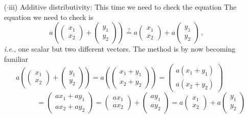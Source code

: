 {\begin{enumerate}
\[b\begin{pmatrix} x_1\\x_2\end{pmatrix}\, ,
\]
as required.
\item[($\cdot$iii)] Additive distributivity:
This time we need to check the equation
The equation we need to check is
\[
a\left(
\begin{pmatrix}x_1\\x_2\end{pmatrix}
+
\begin{pmatrix}y_1\\y_2\end{pmatrix}\right)\stackrel?=
a\begin{pmatrix}x_1\\x_2\end{pmatrix}+
a\begin{pmatrix}y_1\\y_2\end{pmatrix}
\, ,
\] 
{\it i.e.}, one scalar but two different vectors.
The method is by now becoming familiar
\[
a\left(
\begin{pmatrix}x_1\\x_2\end{pmatrix}
+
\begin{pmatrix}y_1\\y_2\end{pmatrix}\right)=
a\left(
\begin{pmatrix}x_1+y_1\\x_2+y_2\end{pmatrix}
\right)
=
\begin{pmatrix}a(x_1+y_1)\\a(x_2+y_2)\end{pmatrix}
\qquad\] \[\qquad\qquad=
\begin{pmatrix}ax_1+ay_1\\ax_2+ay_2\end{pmatrix}
=
\begin{pmatrix}ax_1\\ax_2\end{pmatrix}+
\begin{pmatrix}ay_1\\ay_2\end{pmatrix}
=
a\begin{pmatrix}x_1\\x_2\end{pmatrix}+
a\begin{pmatrix}y_1\\y_2\end{pmatrix}
\]
\end{enumerate}}
